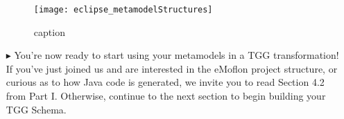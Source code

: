 \begin{itemize}
\begin{figure}[htbp]
\begin{center}
  \texttt{[image: eclipse\_metamodelStructures]}
  \caption{caption}
  \label{fig:bothmetamodelstructures}
\end{center}
\end{figure}

\item[$\blacktriangleright$] You're now ready to start using your metamodels in a TGG transformation! If you've just joined us and are interested in the eMoflon
project structure, or curious as to how Java code is generated, we invite you to read Section 4.2 from Part I. Otherwise, continue to the next section to begin
building your TGG Schema.

\end{itemize}

